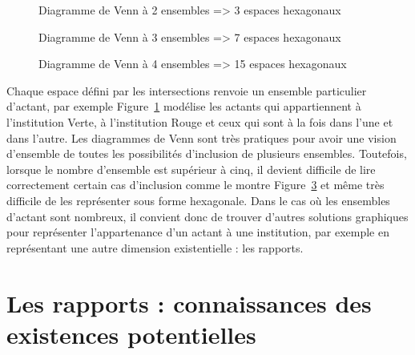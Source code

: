 \documentclass[
  a4paper,
  DIV=11,
  numbers=noendperiod]{scrreprt}
\begin{document}
\begin{figure}


\caption{\label{fig-hexaVenn2}Diagramme de Venn à 2 ensembles
=\textgreater{} 3 espaces hexagonaux}

\end{figure}%

\begin{figure}


\caption{\label{fig-hexaVenn3}Diagramme de Venn à 3 ensembles
=\textgreater{} 7 espaces hexagonaux}

\end{figure}%

\begin{figure}


\caption{\label{fig-hexaVenn4}Diagramme de Venn à 4 ensembles
=\textgreater{} 15 espaces hexagonaux}

\end{figure}%

Chaque espace défini par les intersections renvoie un ensemble
particulier d'actant, par exemple Figure~\ref{fig-hexaVenn2} modélise
les actants qui appartiennent à l'institution Verte, à l'institution
Rouge et ceux qui sont à la fois dans l'une et dans l'autre. Les
diagrammes de Venn sont très pratiques pour avoir une vision d'ensemble
de toutes les possibilités d'inclusion de plusieurs ensembles.
Toutefois, lorsque le nombre d'ensemble est supérieur à cinq, il devient
difficile de lire correctement certain cas d'inclusion comme le montre
Figure~\ref{fig-hexaVenn4} et même très difficile de les représenter
sous forme hexagonale. Dans le cas où les ensembles d'actant sont
nombreux, il convient donc de trouver d'autres solutions graphiques pour
représenter l'appartenance d'un actant à une institution, par exemple en
représentant une autre dimension existentielle : les rapports.

\section{Les rapports : connaissances des existences
potentielles}\label{sec-rapportsInstExis}
\end{document}
